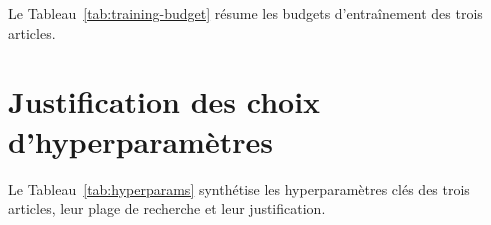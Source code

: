 Le Tableau~\ref{tab:training-budget} résume les budgets d'entraînement des trois articles.

\begin{table}[htbp]
\centering
\caption{Budgets d'entraînement des trois articles. Les heures GPU sont mesurées sur NVIDIA A100 40~GB.}
\label{tab:training-budget}
\end{table}


\section{Justification des choix d'hyperparamètres}\label{sec:demarche-hyperparam}

Le Tableau~\ref{tab:hyperparams} synthétise les hyperparamètres clés des trois articles, leur plage de recherche et leur justification.

